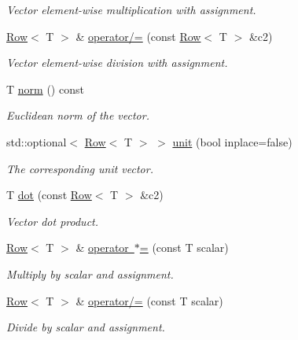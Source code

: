 \begin{DoxyCompactItemize}
\begin{DoxyCompactList}\small\item\em Vector element-\/wise multiplication with assignment. \end{DoxyCompactList}\item 
\mbox{\hyperlink{classtao_1_1deprecated_1_1_row}{Row}}$<$ T $>$ \& \mbox{\hyperlink{classtao_1_1deprecated_1_1_row_af3e824e781b2c81ebbf1dd8739dc3c98}{operator/=}} (const \mbox{\hyperlink{classtao_1_1deprecated_1_1_row}{Row}}$<$ T $>$ \&c2)
\begin{DoxyCompactList}\small\item\em Vector element-\/wise division with assignment. \end{DoxyCompactList}\item 
T \mbox{\hyperlink{classtao_1_1deprecated_1_1_row_aee5789eadcc7de529f38226e2f959d1c}{norm}} () const
\begin{DoxyCompactList}\small\item\em Euclidean norm of the vector. \end{DoxyCompactList}\item 
std\+::optional$<$ \mbox{\hyperlink{classtao_1_1deprecated_1_1_row}{Row}}$<$ T $>$ $>$ \mbox{\hyperlink{classtao_1_1deprecated_1_1_row_a8e523db6cc0623ef5497995e90c41b7d}{unit}} (bool inplace=false)
\begin{DoxyCompactList}\small\item\em The corresponding unit vector. \end{DoxyCompactList}\item 
T \mbox{\hyperlink{classtao_1_1deprecated_1_1_row_a8f58fe81edb3a35cf715760ac676cd40}{dot}} (const \mbox{\hyperlink{classtao_1_1deprecated_1_1_row}{Row}}$<$ T $>$ \&c2)
\begin{DoxyCompactList}\small\item\em Vector dot product. \end{DoxyCompactList}\item 
\mbox{\hyperlink{classtao_1_1deprecated_1_1_row}{Row}}$<$ T $>$ \& \mbox{\hyperlink{classtao_1_1deprecated_1_1_row_accb9ab32b02613712940160b7b96502f}{operator $\ast$=}} (const T scalar)
\begin{DoxyCompactList}\small\item\em Multiply by scalar and assignment. \end{DoxyCompactList}\item 
\mbox{\hyperlink{classtao_1_1deprecated_1_1_row}{Row}}$<$ T $>$ \& \mbox{\hyperlink{classtao_1_1deprecated_1_1_row_ab242e3d56534a00c5942c35a4770c79f}{operator/=}} (const T scalar)
\begin{DoxyCompactList}\small\item\em Divide by scalar and assignment. \end{DoxyCompactList}\end{DoxyCompactItemize}
